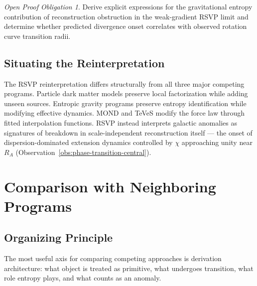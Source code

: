 \documentclass[11pt, a4paper]{article}
\theoremstyle{plain}
\theoremstyle{definition}
\theoremstyle{remark}
\newtheorem{obligation}[theorem]{Open Proof Obligation}
\newcommand{\RA}{R_{\!A}}
\begin{document}
\begin{obligation}
\label{obl:entropy-signal}
Derive explicit expressions for the gravitational entropy contribution of
reconstruction obstruction in the weak-gradient RSVP limit and determine whether
predicted divergence onset correlates with observed rotation curve transition radii.
\end{obligation}

\subsection{Situating the Reinterpretation}

The RSVP reinterpretation differs structurally from all three major competing
programs. Particle dark matter models preserve local factorization while adding
unseen sources. Entropic gravity programs \cite{verlinde2017,padmanabhan2010}
preserve entropy identification while modifying effective dynamics. MOND and TeVeS
\cite{milgrom1983,bekenstein2004} modify the force law through fitted interpolation
functions. RSVP instead interprets galactic anomalies as signatures of breakdown in
scale-independent reconstruction itself --- the onset of dispersion-dominated
extension dynamics controlled by $\chi$ approaching unity near $\RA$
(Observation~\ref{obs:phase-transition-central}).

\section{Comparison with Neighboring Programs}
\label{sec:comparison}

\subsection{Organizing Principle}

The most useful axis for comparing competing approaches is derivation architecture:
what object is treated as primitive, what undergoes transition, what role entropy
plays, and what counts as an anomaly.
\end{document}

